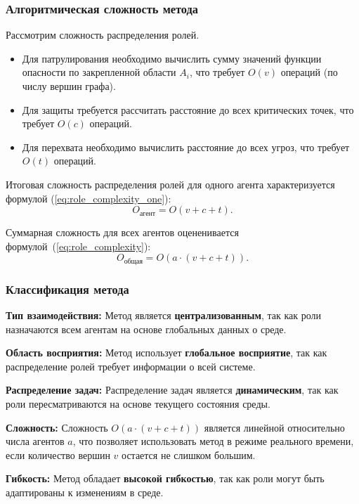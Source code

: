 \subsubsection*{Алгоритмическая сложность метода}
Рассмотрим сложность распределения ролей.  
\begin{itemize}
	\item Для патрулирования необходимо вычислить сумму значений функции опасности по закрепленной области $A_i$, что требует $O(v)$ операций (по числу вершин графа).
	\item Для защиты требуется рассчитать расстояние до всех критических точек, что требует $O(c)$ операций.
	\item Для перехвата необходимо вычислить расстояние до всех угроз, что требует $O(t)$ операций.
\end{itemize}

Итоговая сложность распределения ролей для одного агента характеризуется формулой (\ref{eq:role_complexity_one}):
\begin{equation}
	\label{eq:role_complexity_one}
	O_{\text{агент}} = O(v + c + t).
\end{equation}

Суммарная сложность для всех агентов оцененивается формулой~(\ref{eq:role_complexity}):
\begin{equation}
	\label{eq:role_complexity}
	O_{\text{общая}} = O(a \cdot (v + c + t)).
\end{equation}

\subsubsection*{Классификация метода}
\textbf{Тип взаимодействия:}  
Метод является \textbf{централизованным}, так как роли назначаются всем агентам на основе глобальных данных о среде.

\textbf{Область восприятия:}  
Метод использует \textbf{глобальное восприятие}, так как распределение ролей требует информации о всей системе.  

\textbf{Распределение задач:}  
Распределение задач является \textbf{динамическим}, так как роли пересматриваются на основе текущего состояния среды.  

\textbf{Сложность:}  
Сложность $O(a \cdot (v + c + t))$ является линейной относительно числа агентов $a$, что позволяет использовать метод в режиме реального времени, если количество вершин $v$ остается не слишком большим.  

\textbf{Гибкость:}  
Метод обладает \textbf{высокой гибкостью}, так как роли могут быть адаптированы к изменениям в среде.  

